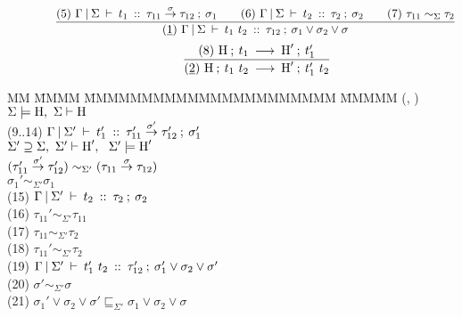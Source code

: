 \begin{flushleft}
\bigskip
\bigskip
\bigskip
$$
\qq \qq
	\frac	
	{ (5) \ \tyJudge{\Gamma}{\Sigma}
		{t_1}
		{\tau_{11} \funa{\sigma} \tau_{12}}
		{\sigma_1}
	  \qq
	  (6) \ \tyJudge{\Gamma}{\Sigma}
		{t_2}
		{\tau_2}
		{\sigma_2}
	  \qq
	  (7) \	\tau_{11} \sim_\Sigma \tau_2{}
	}
	{ (\un{1})
		\ \tyJudge{\Gamma}{\Sigma}
		{t_1 \ t_2}
		{\tau_{12}}
		{\sigma_1 \lor \sigma_2 \lor \sigma}
	}
$$
$$
\qquad \qquad
	\frac
	{ (8) \ \textrm{H} \: ; \: t_1 \: \longrightarrow \: \textrm{H}' \: ; \: t_1'
	}
	{ (\underline{2})
		 \ \textrm{H} \: ; \: t_1 \ t_2 \: \longrightarrow \: \textrm{H}' \: ; \: t_1' \ t_2
	}
$$
\begin{tabbing}
MM \= MMMM \= MMMMMMMMMMMMMMMMMMMMMM \= MMMMM  \kill
\>	(, )
		\> $\Sigma \models \textrm{H}, \ \Sigma \vdash \textrm{H}$
		\> 
\\[1ex]
\>	(9..14) \> $\Gamma \: \arrowvert \: \Sigma' \: \vdash \: t_1' \: :: \: \tau_{11}' \stackrel{\sigma'}{\rightarrow} \tau_{12}' \: ; \: \sigma_1'$
\\[0.2ex]
\>		\> \qq $\Sigma' \supseteq \Sigma, \ \Sigma' \vdash \textrm{H}', \ \ \Sigma' \models \textrm{H}'$
\\[0.2ex]
\>		\> \qq $(\tau_{11}' \stackrel{\sigma'}{\rightarrow} \tau_{12}')  \sim_{\Sigma'}
			      (\tau_{11} \stackrel{\sigma}{\rightarrow} \tau_{12}) $
\\[0.2ex]
\>		\> \qq $\sigma_1'  \sim_{\Sigma'} \sigma_1$ 		
		\> 
\\[1ex]
\>	(15) 	\> $\Gamma \: \arrowvert \: \Sigma' \: \vdash \: t_2 \: :: \: \tau_2 \: ; \: \sigma_2$
		\> 
\\[1ex]
\>	(16) 	\> $\tau_{11}' \sim_{\Sigma'} \tau_{11}$
		\> 
\\[1ex]
\>	(17) 	\> $\tau_{11} \sim_{\Sigma'} \tau_{2}$
		\> 
\\[1ex]
\>	(18) 	\> $\tau_{11}' \sim_{\Sigma'} \tau_{2}$
		\> 
\\[1ex] 
\>	(19) 	\> $\Gamma \: \arrowvert \: \Sigma' \: \vdash \: t_1' \ t_2 \: :: \: \tau_{12}' \: ; \: \sigma_1' \lor \sigma_2 \lor \sigma'$
		\> 
\\[1ex]
\>	(20) 	\> $\sigma' \sim_{\Sigma'} \sigma$		
		\> 
\\[1ex]
\>	(21) 	\> $\sigma_1' \lor \sigma_2 \lor \sigma'
				\sqsubseteq_{\Sigma'}
				\sigma_1 \lor \sigma_2 \lor \sigma$
		\> 
\end{tabbing}



\clearpage{}

		

\end{flushleft}
